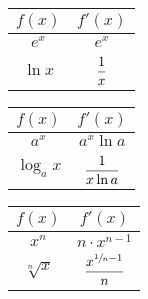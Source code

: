 \begin{blueBox}

  \begin{minipage}{.3\textwidth}
    \def\arraystretch{1.5}\centering
    \begin{tabular}{c c}
      $f(x)$   & $f'(x)$                                                   \\ \toprule
      $e^x$    & $e^x$                                                     \\[2mm]
      $\ln x $ & $\dfrac{1}{x} \vphantom{\dfrac{x^{\sfrac{1}{n} - 1}}{n}}$ \\ \bottomrule
    \end{tabular}
  \end{minipage}\hfill\begin{minipage}{.3\textwidth}
    \def\arraystretch{1.5}\centering
    \begin{tabular}{c c}
      $f(x)$     & $f'(x)$                                                         \\ \toprule
      $a^x$      & $a^x \ln a$                                                     \\[2mm]
      $\log_a x$ & $\dfrac{1}{x \ln a} \vphantom{\dfrac{x^{\sfrac{1}{n} - 1}}{n}}$ \\ \bottomrule
    \end{tabular}
  \end{minipage}\hfill\begin{minipage}{.3\textwidth}
    \def\arraystretch{1.5}\centering
    \begin{tabular}{c c}
      $f(x)$        & $f'(x)$                           \\ \toprule
      $x^n$         & $n \cdot x^{n - 1}$               \\[2mm]
      $\sqrt[n]{x}$ & $\dfrac{x^{\sfrac{1}{n} - 1}}{n}$ \\ \bottomrule
    \end{tabular}
  \end{minipage}
\end{blueBox}
